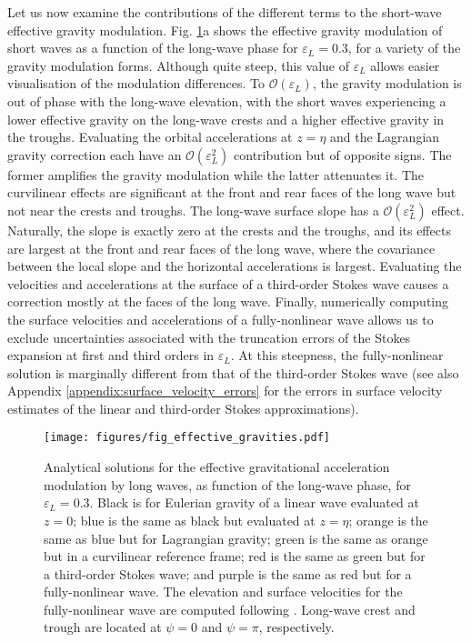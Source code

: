 \documentclass[lineno]{jfm}
\begin{document}
Let us now examine the contributions of the different terms to the short-wave
effective gravity modulation.
Fig. \ref{fig:effective_gravities}a shows the effective gravity modulation of
short waves as a function of the long-wave phase for $\varepsilon_L = 0.3$, for
a variety of the gravity modulation forms.
Although quite steep, this value of $\varepsilon_L$ allows easier visualisation
of the modulation differences.
To $\mathcal{O}(\varepsilon_L)$, the gravity modulation is out of phase
with the long-wave elevation, with the short waves experiencing a lower effective
gravity on the long-wave crests and a higher effective gravity in the troughs.
Evaluating the orbital accelerations at $z=\eta$ and the Lagrangian gravity
correction each have an $\mathcal{O}(\varepsilon_L^2)$ contribution but of
opposite signs.
The former amplifies the gravity modulation while the latter attenuates it.
The curvilinear effects are significant at the front and rear faces of the long
wave but not near the crests and troughs.
The long-wave surface slope has a $\mathcal{O}(\varepsilon_L^2)$ effect.
Naturally, the slope is exactly zero at the crests and the troughs, and its
effects are largest at the front and rear faces of the long wave, where the
covariance between the local slope and the horizontal accelerations is largest.
Evaluating the velocities and accelerations at the surface of a third-order Stokes
wave causes a correction mostly at the faces of the long wave.
Finally, numerically computing the surface velocities and accelerations of a
fully-nonlinear wave allows us to exclude uncertainties associated with the
truncation errors of the Stokes expansion at first and third orders in
$\varepsilon_L$.
At this steepness, the fully-nonlinear solution is marginally different from
that of the third-order Stokes wave
(see also Appendix \ref{appendix:surface_velocity_errors} for the errors
in surface velocity estimates of the linear and third-order Stokes
approximations).

\begin{figure}
\centering
\texttt{[image: figures/fig\_effective\_gravities.pdf]}
\caption{
  Analytical solutions for the effective gravitational acceleration
  modulation by long waves, as function of the long-wave phase, for $\varepsilon_L = 0.3$.
  Black is for Eulerian gravity of a linear wave evaluated at $z=0$;
  blue is the same as black but evaluated at $z=\eta$;
  orange is the same as blue but for Lagrangian gravity;
  green is the same as orange but in a curvilinear reference frame;
  red is the same as green but for a third-order Stokes wave;
  and purple is the same as red but for a fully-nonlinear wave.
  The elevation and surface velocities for the fully-nonlinear wave are computed
  following \citet{clamond2018accurate}.
  Long-wave crest and trough are located at $\psi = 0$ and $\psi = \pi$,
  respectively.
}
\label{fig:effective_gravities}
\end{figure}
\end{document}
